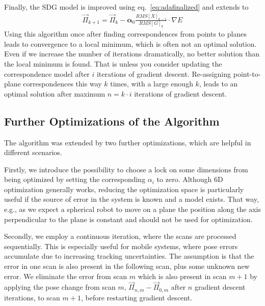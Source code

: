 Finally, the SDG model is improved using eq.~\eqref{eq:adafinalized} and extends to 
\begin{align}
    \vec{\Pi}_{k+1} = \vec{\Pi}_{k} - \boldsymbol\alpha_0  \frac{RMS[X]_{k-1}}{RMS[G]_{k}} \cdot \nabla E
\end{align}
Using this algorithm once after finding correspondences from points to planes leads to convergence to a local minimum, which is often not an optimal solution.
Even if we increase the number of iterations dramatically, no better solution than the local minimum is found.
That is unless you consider updating the correspondence model after $i$ iterations of gradient descent.
Re-assigning point-to-plane correspondences this way $k$ times, with a large enough $k$, leads to an optimal solution after maximum $n = k\cdot i$ iterations of gradient descent.

\subsection{Further Optimizations of the Algorithm}

The algorithm was extended by two further optimizations, which are helpful in different scenarios.

Firstly, we introduce the possibility to choose a lock on some dimensions from being optimized by setting the corresponding $\alpha_i$ to zero.
Although 6D optimization generally works, reducing the optimization space is particularly useful if the source of error in the system is known and a model exists.
That way, e.g., as we expect a spherical robot to move on a plane the position along the axis perpendicular to the plane is constant and should not be used for optimization. 

Secondly, we employ a continuous iteration, where the scans are processed sequentially. 
This is especially useful for mobile systems, where pose errors accumulate due to increasing tracking uncertainties.
The assumption is that the error in one scan is also present in the following scan, plus some unknown new error.
We eliminate the error from scan $m$ which is also present in scan $m+1$ by applying the pose change from scan $m$, $\vec{\Pi}_{n,m} - \vec{\Pi}_{0,m}$ after $n$ gradient descent iterations, to scan $m+1$, before restarting gradient descent.
